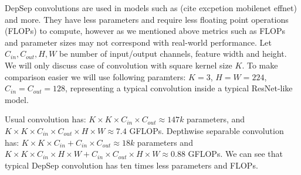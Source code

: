 DepSep convolutions are used in models such as (cite excpetion mobilenet effnet) and more. They have less parameters and require less floating point operations (FLOPs) to compute, however as we mentioned above metrics such as FLOPs and parameter sizes may not correspond with real-world performance. Let $C_{in}, C_{out}, H, W$ be number of input/output channels, feature width and height. We will only discuss case of convolution with square kernel size $K$. To make comparison easier we will use following paramters: $K=3$, $H=W=224$, $C_{in} = C_{out}=128$, representing a typical convolution inside a typical ResNet-like model.  

Usual convolution has: $ K \times K \times C_{in} \times C_{out} \approx 147k$ parameters, and $ K \times K \times C_{in} \times C_{out} \times H \times W \approx 7.4 $ GFLOPs. Depthwise separable convolution has: $ K \times K \times C_{in} + C_{in} \times C_{out} \approx 18k$ parameters and $ K \times K \times C_{in} \times H \times W + C_{in} \times C_{out} \times H \times W \approx 0.88$ GFLOPs. We can see that typical DepSep convolution has ten times less parameters and FLOPs.


% 

% 

